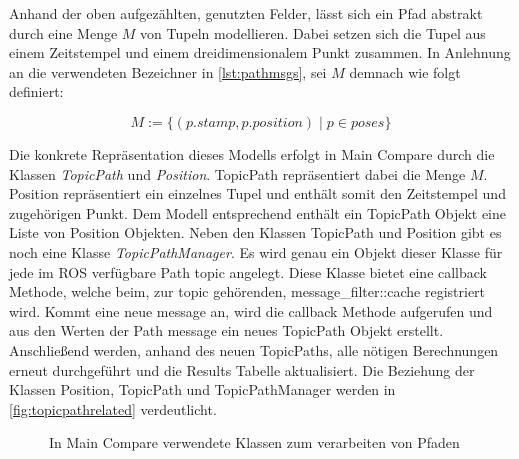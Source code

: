 Anhand der oben aufgezählten, genutzten Felder, lässt sich ein Pfad abstrakt durch eine Menge
$M$ von Tupeln modellieren. Dabei setzen sich die Tupel aus einem Zeitstempel und einem dreidimensionalem
Punkt zusammen. In Anlehnung an die verwendeten Bezeichner in
\autoref{lst:pathmsgs}, sei $M$ demnach wie folgt definiert:

\begin{equation*}
  \label{eqn:setdef}
  M := \{ (p.stamp , p.position) \mid p \in poses \}
\end{equation*}

Die konkrete Repräsentation dieses Modells erfolgt in Main Compare durch die
Klassen \textit{TopicPath} und \textit{Position}. TopicPath repräsentiert dabei
die Menge $M$. Position repräsentiert ein einzelnes Tupel und enthält somit den
Zeitstempel und zugehörigen Punkt. Dem Modell entsprechend enthält ein
TopicPath Objekt eine Liste von Position Objekten.  Neben den Klassen TopicPath
und Position gibt es noch eine Klasse \textit{TopicPathManager}. Es wird genau
ein Objekt dieser Klasse für jede im ROS verfügbare Path topic angelegt. Diese
Klasse bietet eine callback Methode, welche beim, zur topic gehörenden,
message\_filter::cache registriert wird. Kommt eine neue message an, wird die
callback Methode aufgerufen und aus den Werten der Path message ein neues
TopicPath Objekt erstellt. Anschließend werden, anhand des neuen TopicPaths,
alle nötigen Berechnungen erneut durchgeführt und die Results Tabelle
aktualisiert. Die Beziehung der Klassen Position, TopicPath und
TopicPathManager werden in \autoref{fig:topicpathrelated} verdeutlicht.

\begin{figure}[t]
  \begin{center}
  \end{center}
  \caption{In Main Compare verwendete Klassen zum verarbeiten von Pfaden}
  \label{fig:topicpathrelated}
\end{figure}


